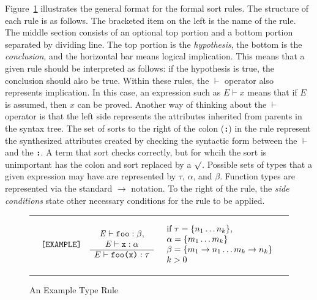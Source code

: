\documentclass[12pt]{article} %
\newcommand{\reserved}[1]{\textbf{\texttt{#1}}} %
\newcommand{\RULELAB}[1]{\texttt{#1}}
\newcommand{\UNSPACEFORBOX}{\vspace{-2ex}}
\newcommand{\HLINE}{\UNSPACEFORBOX%
\begin{flushleft}\rule{\textwidth}{0.01in}\end{flushleft}%
\UNSPACEFORBOX}
\newenvironment{BFIGURE}{

\begin{figure}
\small
\HLINE
}{
\HLINE
\normalsize
\end{figure}
}
\begin{document}
Figure~\ref{typeruleex} illustrates the general format for the formal
sort rules. The structure of each rule is as follows. The bracketed
item on the left is the name of the rule. The middle section consists
of an optional top portion and a bottom portion separated by dividing
line. The top portion is the \emph{hypothesis}, the bottom is the
\emph{conclusion}, and the horizontal bar means logical
implication. This means that a given rule should be interpreted as follows:
if the hypothesis is true, the conclusion should also be true. Within
these rules, the $\vdash$ operator also represents implication. In
this case, an expression such as $E \vdash x$ means that if $E$ is
assumed, then $x$ can be proved. Another way of thinking about the
$\vdash$ operator is that the left side represents the attributes
inherited from parents in the syntax tree. The set of sorts to the
right of the colon (\reserved{:}) in the rule represent the
synthesized attributes created by checking the syntactic form between
the $\vdash$ and the \reserved{:}. A
term that sort checks correctly, but for whcih the sort is unimportant 
has the colon and sort replaced by a $\surd$. Possible
sets of types that a given expression may have are represented by
$\tau$, $\alpha$, and $\beta$. Function types are represented via the
standard $\rightarrow$ notation. To the right of the rule, the
\emph{side conditions} state other necessary conditions for the rule
to be applied.

\begin{BFIGURE}
\begin{displaymath}
\begin{array}{lll}
\RULELAB{[EXAMPLE]} &
\begin{array}{c}
\mbox{\textit{E}} \vdash \mbox{\texttt{foo}}:\beta,\\
\mbox{\textit{E}} \vdash \mbox{\texttt{x}}:\alpha \\
\hline
E \vdash \mbox{\texttt{foo(x)}}:\tau
\end{array}
&
\begin{array}{l}
\mbox{if } \tau = \{n_1 \dots n_k\}, \\
\alpha = \{m_1 \dots m_k\} \\
\beta = \{m_1 \rightarrow n_1 \dots m_k \rightarrow n_k\} \\
k > 0
\\
\end{array}
\end{array}
\end{displaymath}
\caption{An Example Type Rule}
\label{typeruleex}
\end{BFIGURE}
\end{document}
